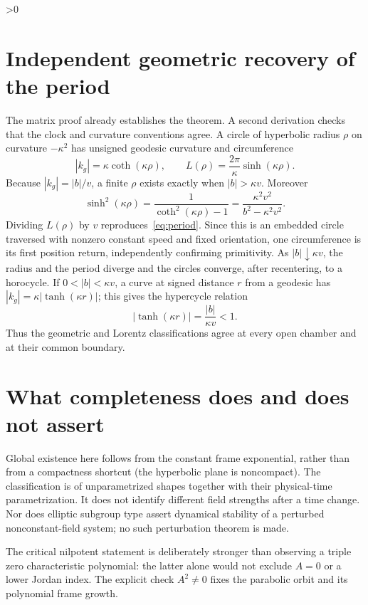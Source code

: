 \documentclass[10pt]{article}
\providecommand{\CRevisionRound}{2}
\begin{document}
\ifnum\CRevisionRound>0
\section{Independent geometric recovery of the period}
The matrix proof already establishes the theorem.  A second derivation checks
that the clock and curvature conventions agree.  A circle of hyperbolic
radius $\rho$ on curvature $-\kappa^2$ has unsigned geodesic curvature and
circumference
\begin{equation}\label{eq:circlegeometry}
 |k_g|=\kappa\coth(\kappa\rho),\qquad
 L(\rho)=\frac{2\pi}{\kappa}\sinh(\kappa\rho).
\end{equation}
Because $|k_g|=|b|/v$, a finite $\rho$ exists exactly when
$|b|>\kappa v$.  Moreover
\[
 \sinh^2(\kappa\rho)
 =\frac{1}{\coth^2(\kappa\rho)-1}
 =\frac{\kappa^2v^2}{b^2-\kappa^2v^2}.
\]
Dividing $L(\rho)$ by $v$ reproduces~\eqref{eq:period}.  Since this is an
embedded circle traversed with nonzero constant speed and fixed orientation,
one circumference is its first position return, independently confirming
primitivity.  As
$|b|\downarrow\kappa v$, the radius and the period diverge and the circles
converge, after recentering, to a horocycle.  If $0<|b|<\kappa v$, a curve at
signed distance $r$ from a geodesic has
$|k_g|=\kappa|\tanh(\kappa r)|$; this gives the hypercycle relation
\begin{equation}\label{eq:hypercycle}
 |\tanh(\kappa r)|=\frac{|b|}{\kappa v}<1.
\end{equation}
Thus the geometric and Lorentz classifications agree at every open chamber
and at their common boundary.

\section{What completeness does and does not assert}
Global existence here follows from the constant frame exponential, rather
than from a compactness shortcut (the hyperbolic plane is noncompact).  The
classification is of unparametrized shapes together with their physical-time
parametrization.  It does not identify different field strengths after a
time change.  Nor does elliptic subgroup type assert dynamical stability of
a perturbed nonconstant-field system; no such perturbation theorem is made.

The critical nilpotent statement is deliberately stronger than observing a
triple zero characteristic polynomial: the latter alone would not exclude
$A=0$ or a lower Jordan index.  The explicit check $A^2\ne0$ fixes the
parabolic orbit and its polynomial frame growth.
\fi
\end{document}
